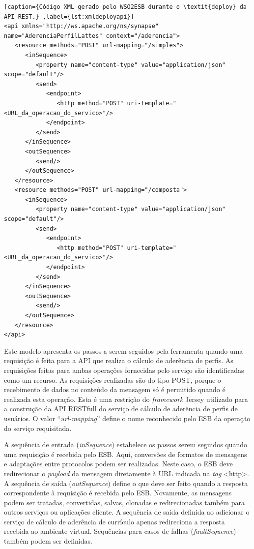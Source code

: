 \begin{lstlisting}[caption={Código XML gerado pelo WSO2ESB durante o \textit{deploy} da API REST.} ,label={lst:xmldeployapi}]
<api xmlns="http://ws.apache.org/ns/synapse" name="AderenciaPerfilLattes" context="/aderencia">
   <resource methods="POST" url-mapping="/simples">
      <inSequence>
         <property name="content-type" value="application/json" scope="default"/>
         <send>
            <endpoint>
               <http method="POST" uri-template="<URL_da_operacao_do_servico>"/>
            </endpoint>
         </send>
      </inSequence>
      <outSequence>
         <send/>
      </outSequence>
   </resource>
   <resource methods="POST" url-mapping="/composta">
      <inSequence>
         <property name="content-type" value="application/json" scope="default"/>
         <send>
            <endpoint>
               <http method="POST" uri-template="<URL_da_operacao_do_servico>"/>
            </endpoint>
         </send>
      </inSequence>
      <outSequence>
         <send/>
      </outSequence>
   </resource>
</api>
\end{lstlisting}

Este modelo apresenta os passos a serem seguidos pela ferramenta quando uma requisição é feita para a API que realiza o cálculo de aderência de perfis. As requisições feitas para ambas operações fornecidas pelo serviço são identificadas como um recurso. As requisições realizadas são do tipo POST, porque o recebimento de dados no conteúdo da mensagem só é permitido quando é realizada esta operação. Esta é uma restrição do \textit{framework} Jersey utilizado para a construção da API RESTfull do serviço de cálculo de aderência de perfis de usuários. O valor “\textit{url-mapping}” define o nome reconhecido pelo ESB da operação do serviço requisitada.

A sequência de entrada (\textit{inSequence}) estabelece os passos serem seguidos quando uma requisição é recebida pelo ESB. Aqui, conversões de formatos de mensagens e adaptações entre protocolos podem ser realizadas. Neste caso, o ESB deve redirecionar o \textit{payload} da mensagem diretamente à URL indicada na \textit{tag} <http>. A sequência de saída (\textit{outSequence}) define o que deve ser feito quando a resposta correspondente à requisição é recebida pelo ESB. Novamente, as mensagens podem ser tratadas, convertidas, salvas, clonadas e redirecionadas também para outros serviços ou aplicações cliente. A sequência de saída definida ao adicionar o serviço de cálculo de aderência de currículo apenas redireciona a resposta recebida ao ambiente virtual. Sequências para casos de falhas (\textit{faultSequence}) também podem ser definidas.

